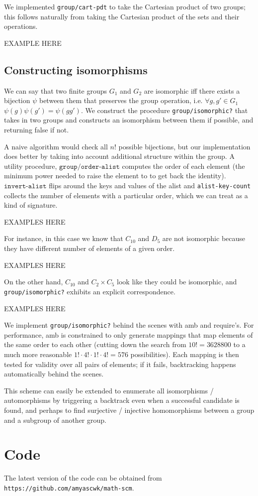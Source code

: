 \documentclass{article}
\begin{document}
		We implemented \texttt{group/cart-pdt} to take the Cartesian product of two groups; this follows naturally from taking the Cartesian product of the sets and their operations.
		
		EXAMPLE HERE
    
    	\subsection{Constructing isomorphisms}
	
		We can say that two finite groups $G_1$ and $G_2$ are isomorphic iff there exists a bijection $\psi$ between them that preserves the group operation, i.e. $\forall g, g' \in G_1$ $\psi(g)\psi(g') = \psi(gg')$. We construct the procedure \texttt{group/isomorphic?} that takes in two groups and constructs an isomorphism between them if possible, and returning false if not.
		
		A naive algorithm would check all $n!$ possible bijections, but our implementation does better by taking into account additional structure within the group. A utility procedure, $\texttt{group/order-alist}$ computes the order of each element (the minimum power needed to raise the element to to get back the identity). $\texttt{invert-alist}$ flips around the keys and values of the alist and \texttt{alist-key-count} collects the number of elements with a particular order, which we can treat as a kind of signature.
		
		EXAMPLES HERE
		
		For instance, in this case we know that $C_{10}$ and $D_5$ are not isomorphic because they have different number of elements of a given order.

		EXAMPLES HERE
		
		On the other hand, $C_{10}$ and $C_2 \times C_5$ look like they could be isomorphic, and \texttt{group/isomorphic?} exhibits an explicit correspondence.

		EXAMPLES HERE
		
		We implement \texttt{group/isomorphic?} behind the scenes with amb and require's. For performance, amb is constrained to only generate mappings that map elements of the same order to each other (cutting down the search from $10! = 3628800$ to a much more reasonable $1! \cdot 4! \cdot 1! \cdot 4! = 576$ possibilities). Each mapping is then tested for validity over all pairs of elements; if it fails, backtracking happens automatically behind the scenes.
		
		This scheme can easily be extended to enumerate all isomorphisms / automorphisms by triggering a backtrack even when a successful candidate is found, and perhaps to find surjective / injective homomorphisms between a group and a subgroup of another group.    
    \section{Code}
        
        The latest version of the code can be obtained from \texttt{https://github.com/amyascwk/math-scm}.
        
    
\end{document}
